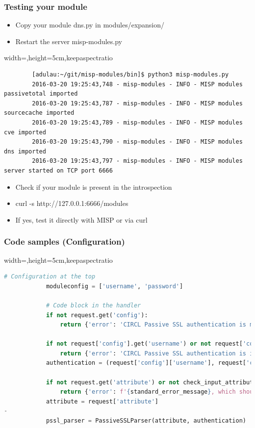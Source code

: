 \begin{frame}[t,fragile]
        \frametitle{Testing your module}
        \begin{itemize}
                \item Copy your module dns.py in modules/expansion/
                \item Restart the server misp-modules.py
        \end{itemize}
        \begin{adjustbox}{width=\textwidth,height=5cm,keepaspectratio}
        \begin{lstlisting}
        [adulau:~/git/misp-modules/bin]$ python3 misp-modules.py
        2016-03-20 19:25:43,748 - misp-modules - INFO - MISP modules passivetotal imported
        2016-03-20 19:25:43,787 - misp-modules - INFO - MISP modules sourcecache imported
        2016-03-20 19:25:43,789 - misp-modules - INFO - MISP modules cve imported
        2016-03-20 19:25:43,790 - misp-modules - INFO - MISP modules dns imported
        2016-03-20 19:25:43,797 - misp-modules - INFO - MISP modules server started on TCP port 6666
        \end{lstlisting}
        \end{adjustbox}
        \begin{itemize}
                \item Check if your module is present in the introspection
                \item curl -s http://127.0.0.1:6666/modules
                \item If yes, test it directly with MISP or via curl
        \end{itemize}
\end{frame}

\begin{frame}[fragile]
    \frametitle{Code samples (Configuration)}
    \begin{adjustbox}{width=\textwidth,height=5cm,keepaspectratio}
        \begin{lstlisting}[language=python]
            # Configuration at the top
            moduleconfig = ['username', 'password']

            # Code block in the handler
            if not request.get('config'):
                return {'error': 'CIRCL Passive SSL authentication is missing.'}

            if not request['config'].get('username') or not request['config'].get('password'):
                return {'error': 'CIRCL Passive SSL authentication is incomplete, please provide your username and password.'}
            authentication = (request['config']['username'], request['config']['password'])

            if not request.get('attribute') or not check_input_attribute(request['attribute']):
                return {'error': f'{standard_error_message}, which should contain at least a type, a value and an uuid.'}
            attribute = request['attribute']
-
            pssl_parser = PassiveSSLParser(attribute, authentication)

          \end{lstlisting}
    \end{adjustbox}
\end{frame}

